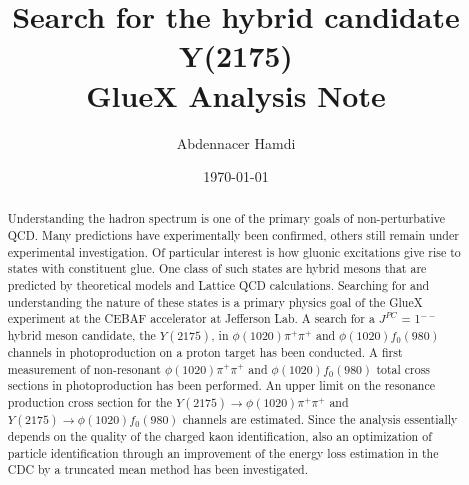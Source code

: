 \begin{titlepage}
  
  \title{{\bf Search for the hybrid candidate Y(2175)}\\
  GlueX Analysis Note}
  \author{Abdennacer Hamdi}
    \date{\today}

  \maketitle
  
  
  \begin{abstract}
    Understanding the hadron spectrum is one of the primary goals of non-perturbative QCD. Many predictions have experimentally been confirmed, others still remain under experimental investigation. Of particular interest is how gluonic excitations give rise to states with constituent glue. One class of such states are hybrid mesons that are predicted by theoretical models and Lattice QCD calculations. Searching for and understanding the nature of these states is a primary physics goal of the GlueX experiment at the CEBAF accelerator at Jefferson Lab. A search for a $J^{PC}$ = 1$^{--}$ hybrid meson candidate, the $Y(2175)$, in $\phi(1020)\pi^{+}\pi^{+}$ and $\phi(1020)f_{0}(980)$ channels in photoproduction on a proton target has been conducted. A first measurement of non-resonant $\phi(1020)\pi^{+}\pi^{+}$ and $\phi(1020)f_{0}(980)$ total cross sections in photoproduction has been performed. An upper limit on the resonance production cross section for the $Y(2175) \rightarrow \phi(1020)\pi^{+}\pi^{+}$ and $Y(2175) \rightarrow \phi(1020)f_0(980)$ channels are estimated. Since the analysis essentially depends on the quality of the charged kaon identification, also an optimization of particle identification through an improvement of the energy loss estimation in the CDC by a truncated mean method has been investigated.
  \end{abstract}

\end{titlepage}